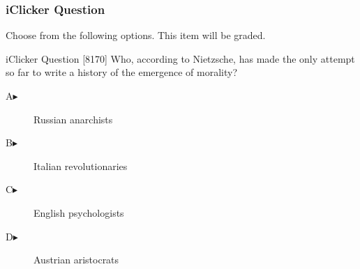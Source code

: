 \begin{frame}
  \frametitle{iClicker Question}
Choose from the following options. This item will be graded.
\begin{block}{iClicker Question}
[8170] Who, according to Nietzsche, has made the only attempt so far to write a history of the emergence of morality?
\end{block}
\begin{description}
\item[A\hspace{.2in}$\blacktriangleright$] Russian anarchists
\item[B\hspace{.2in}$\blacktriangleright$] Italian revolutionaries
\item[C\hspace{.2in}$\blacktriangleright$] English psychologists
\item[D\hspace{.2in}$\blacktriangleright$] Austrian aristocrats
\end{description}
\end{frame}